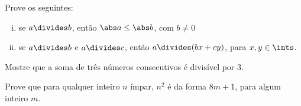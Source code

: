 \begin{exercise}
	Prove os seguintes:
	\begin{enumerate}[(i)]
		\item se $a \divides b$, então $\abs a \leq \abs b$, com $b \neq 0$
		\item se $a \divides b$ e $a \divides c$, então $a \divides (bx + cy)$, para $x, y \in \ints$. 
	\end{enumerate}
\end{exercise}

\begin{exercise}
	Mostre que a soma de três números consecutivos é divisível por $3$.
\end{exercise}

\begin{exercise}
	Prove que para qualquer inteiro $n$ ímpar, $n^2$ é da forma $8m + 1$, para algum inteiro $m$.
\end{exercise}
